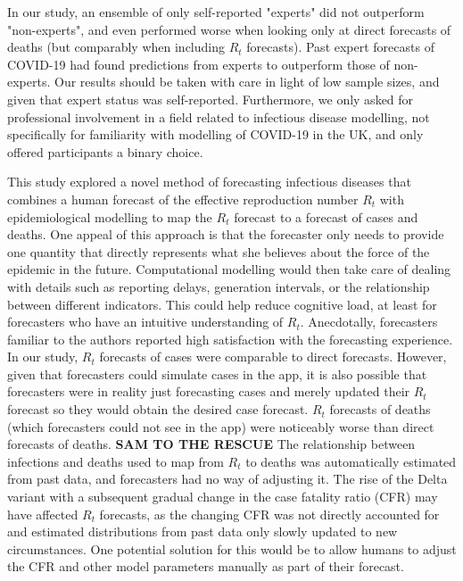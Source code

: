 \documentclass[10pt,a4paper,twocolumn]{article}
\begin{document}

In our study, an ensemble of only self-reported "experts" did not outperform "non-experts", and even performed worse when looking only at direct forecasts of deaths (but comparably when including $R_t$ forecasts). Past expert forecasts of COVID-19 \cite{recchiaHowWellDid2021} had found predictions from experts to outperform those of non-experts. Our results should be taken with care in light of low sample sizes, and given that expert status was self-reported. Furthermore, we only asked for professional involvement in a field related to infectious disease modelling, not specifically for familiarity with modelling of COVID-19 in the UK, and only offered participants a binary choice. 


This study explored a novel method of forecasting infectious diseases that combines a human forecast of the effective reproduction number $R_t$ with epidemiological modelling to map the $R_t$ forecast to a forecast of cases and deaths. One appeal of this approach is that the forecaster only needs to provide one quantity that directly represents what she believes about the force of the epidemic in the future. Computational modelling would then take care of dealing with details such as reporting delays, generation intervals, or the relationship between different indicators. This could help reduce cognitive load, at least for forecasters who have an intuitive understanding of $R_t$. Anecdotally, forecasters familiar to the authors reported high satisfaction with the forecasting experience. In our study, $R_t$ forecasts of cases were comparable to direct forecasts. However, given that forecasters could simulate cases in the app, it is also possible that forecasters were in reality just forecasting cases and merely updated their $R_t$ forecast so they would obtain the desired case forecast. 
$R_t$ forecasts of deaths (which forecasters could not see in the app) were noticeably worse than direct forecasts of deaths. \textbf{SAM TO THE RESCUE} The relationship between infections and deaths used to map from $R_t$ to deaths was automatically estimated from past data, and forecasters had no way of adjusting it. The rise of the Delta variant with a subsequent gradual change in the case fatality ratio (CFR) may have affected $R_t$ forecasts, as the changing CFR was not directly accounted for and estimated distributions from past data only slowly updated to new circumstances. One potential solution for this would be to allow humans to adjust the CFR and other model parameters manually as part of their forecast. 
\end{document}
